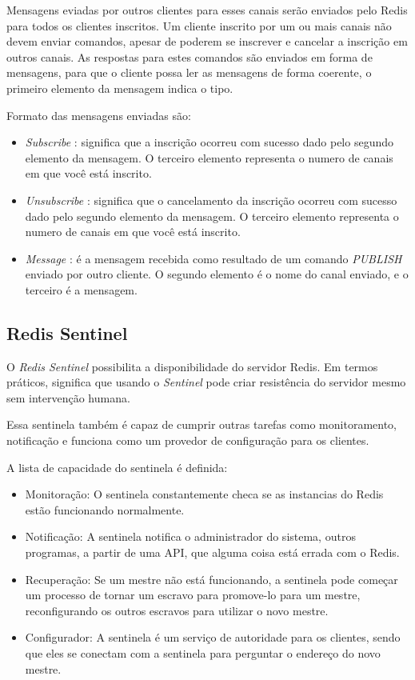 \documentclass[10pt]{IEEEtran}
\begin{document}
Mensagens eviadas por outros clientes para esses canais serão enviados pelo Redis para todos os clientes inscritos.
Um cliente inscrito por um ou mais canais não devem enviar comandos, apesar de poderem se inscrever e cancelar a inscrição em outros canais. As respostas para estes comandos são enviados em forma de mensagens, para que o cliente possa ler as mensagens de forma coerente, o primeiro elemento da mensagem indica o tipo.

Formato das mensagens enviadas são:
\begin{itemize}
\item \textit{Subscribe} : significa que a inscrição ocorreu com sucesso dado pelo segundo elemento da mensagem. O terceiro elemento representa o numero de canais em que você está inscrito.
\item \textit{Unsubscribe} : significa que o cancelamento da inscrição ocorreu com sucesso dado pelo segundo elemento da mensagem. O terceiro elemento representa o numero de canais em que você está inscrito.
\item \textit{Message} : é a mensagem recebida como resultado de um comando \textit{PUBLISH} enviado por outro cliente. O segundo elemento é o nome do canal enviado, e o terceiro é a mensagem.  
\end{itemize}

\subsection{Redis Sentinel}

O \textit{Redis Sentinel} possibilita a disponibilidade do servidor Redis. Em termos práticos, significa que usando o \textit{Sentinel} pode criar resistência do servidor mesmo sem intervenção humana.

Essa sentinela também é capaz de cumprir outras tarefas como monitoramento, notificação e funciona como um provedor de configuração para os clientes.

A lista de capacidade do sentinela é definida:
\begin{itemize}
\item Monitoração: O sentinela constantemente checa se as instancias do Redis estão funcionando normalmente.
\item Notificação: A sentinela notifica o administrador do sistema, outros programas, a partir de uma API, que alguma coisa está errada com o Redis.
\item Recuperação: Se um mestre não está funcionando, a sentinela pode começar um processo de tornar um escravo para promove-lo para um mestre, reconfigurando os outros escravos para utilizar o novo mestre.
\item Configurador: A sentinela é um serviço de autoridade para os clientes, sendo que eles se conectam com a sentinela para perguntar o endereço do novo mestre.
\end{itemize}
\end{document}
